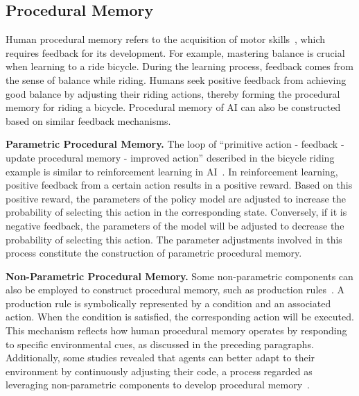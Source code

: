 \documentclass[journal,hideappendix]{vgtc}
\newenvironment{j_itemize}{
\begin{itemize}[]
  \setlength{\itemsep}{3pt}
  \setlength{\parskip}{0pt}
  \setlength{\parsep}{0pt}
}{\end{itemize}}
\begin{document}
\subsection{Procedural Memory}
\label{sec:hierarchy_ai_memory:procedural}

Human procedural memory refers to the acquisition of motor skills~\cite{tulving1985memory}, which requires feedback for its development. For example, mastering balance is crucial when learning to a ride bicycle. During the learning process, feedback comes from the sense of balance while riding. Humans seek positive feedback from achieving good balance by adjusting their riding actions, thereby forming the procedural memory for riding a bicycle. Procedural memory of AI can also be constructed based on similar feedback mechanisms.

\begin{j_itemize}

    \item[$\bullet$] \textbf{Parametric Procedural Memory.} The loop of ``primitive action - feedback - update procedural memory - improved action'' described in the bicycle riding example is similar to reinforcement learning in AI~\cite{kaelbling1996reinforcement,liu2021automated,liu2022feature}. In reinforcement learning, positive feedback from a certain action results in a positive reward. Based on this positive reward, the parameters of the policy model are adjusted to increase the probability of selecting this action in the corresponding state. Conversely, if it is negative feedback, the parameters of the model will be adjusted to decrease the probability of selecting this action. The parameter adjustments involved in this process constitute the construction of parametric procedural memory.

    \item[$\bullet$] \textbf{Non-Parametric Procedural Memory.} Some non-parametric components can also be employed to construct procedural memory, such as production rules~\cite{davis1977production,quinlan1987generating,ceri1991deriving,laird2008extending}. A production rule is symbolically represented by a condition and an associated action. When the condition is satisfied, the corresponding action will be executed. This mechanism reflects how human procedural memory operates by responding to specific environmental cues, as discussed in the preceding paragraphs. Additionally, some studies revealed that agents can better adapt to their environment by continuously adjusting their code, a process regarded as leveraging non-parametric components to develop procedural memory~\cite{wang2023voyager,sumers2023cognitive}.

\end{j_itemize}
\end{document}
